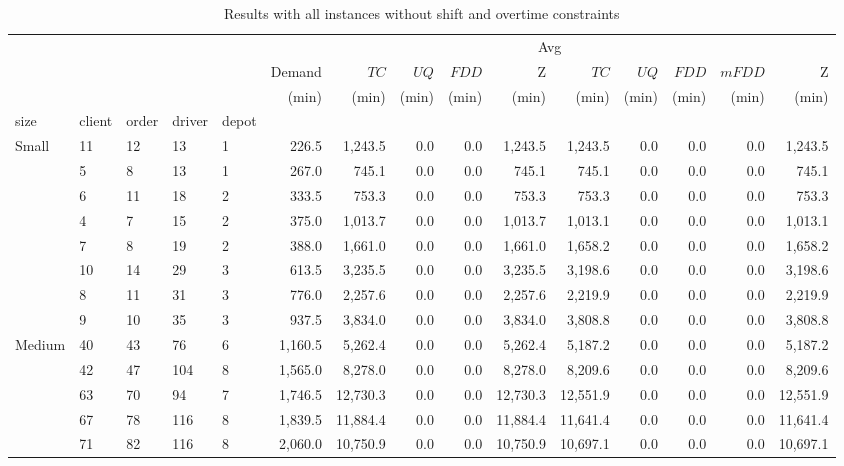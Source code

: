 \begin{table}[htb]
\centering
\caption{Results with all instances without shift and overtime constraints}
\label{tab:cdp_all_instances_no_shift}
\begin{tabular}{lllllrrrrrrrrrr}
\toprule
 &  &  &  &  & \multicolumn{10}{c}{Avg} \\
 &  &  &  &  & Demand & $TC$ & $UQ$ & $FDD$ & Z & $TC$ & $UQ$ & $FDD$ & $mFDD$ & Z \\
 &  &  &  &  & (min) & (min) & (min) & (min) & (min) & (min) & (min) & (min) & (min) & (min) \\
size & client & order & driver & depot &  &  &  &  &  &  &  &  &  &  \\
\midrule
\multirow[c]{8}{*}{Small} & 11 & 12 & 13 & 1 & 226.5 & 1,243.5 & 0.0 & 0.0 & 1,243.5 & 1,243.5 & 0.0 & 0.0 & 0.0 & 1,243.5 \\
 & 5 & 8 & 13 & 1 & 267.0 & 745.1 & 0.0 & 0.0 & 745.1 & 745.1 & 0.0 & 0.0 & 0.0 & 745.1 \\
 & 6 & 11 & 18 & 2 & 333.5 & 753.3 & 0.0 & 0.0 & 753.3 & 753.3 & 0.0 & 0.0 & 0.0 & 753.3 \\
 & 4 & 7 & 15 & 2 & 375.0 & 1,013.7 & 0.0 & 0.0 & 1,013.7 & 1,013.1 & 0.0 & 0.0 & 0.0 & 1,013.1 \\
 & 7 & 8 & 19 & 2 & 388.0 & 1,661.0 & 0.0 & 0.0 & 1,661.0 & 1,658.2 & 0.0 & 0.0 & 0.0 & 1,658.2 \\
 & 10 & 14 & 29 & 3 & 613.5 & 3,235.5 & 0.0 & 0.0 & 3,235.5 & 3,198.6 & 0.0 & 0.0 & 0.0 & 3,198.6 \\
 & 8 & 11 & 31 & 3 & 776.0 & 2,257.6 & 0.0 & 0.0 & 2,257.6 & 2,219.9 & 0.0 & 0.0 & 0.0 & 2,219.9 \\
 & 9 & 10 & 35 & 3 & 937.5 & 3,834.0 & 0.0 & 0.0 & 3,834.0 & 3,808.8 & 0.0 & 0.0 & 0.0 & 3,808.8 \\
\multirow[c]{14}{*}{Medium} & 40 & 43 & 76 & 6 & 1,160.5 & 5,262.4 & 0.0 & 0.0 & 5,262.4 & 5,187.2 & 0.0 & 0.0 & 0.0 & 5,187.2 \\
 & 42 & 47 & 104 & 8 & 1,565.0 & 8,278.0 & 0.0 & 0.0 & 8,278.0 & 8,209.6 & 0.0 & 0.0 & 0.0 & 8,209.6 \\
 & 63 & 70 & 94 & 7 & 1,746.5 & 12,730.3 & 0.0 & 0.0 & 12,730.3 & 12,551.9 & 0.0 & 0.0 & 0.0 & 12,551.9 \\
 & 67 & 78 & 116 & 8 & 1,839.5 & 11,884.4 & 0.0 & 0.0 & 11,884.4 & 11,641.4 & 0.0 & 0.0 & 0.0 & 11,641.4 \\
 & 71 & 82 & 116 & 8 & 2,060.0 & 10,750.9 & 0.0 & 0.0 & 10,750.9 & 10,697.1 & 0.0 & 0.0 & 0.0 & 10,697.1 \\

\end{tabular}
\end{table}
